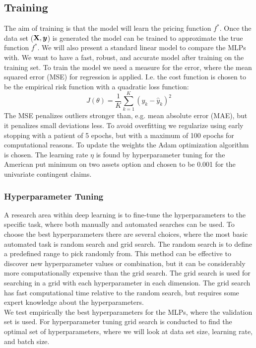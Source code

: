 \subsection{Training}\label{Training}
The aim of training is that the model will learn the pricing function $f^*$. Once the data set ($\mathbf{X}, \bm{y}$) is generated the model can be trained to approximate the true function $f^*$. We will also present a standard linear model to compare the MLPs with. We want to have a fast, robust, and accurate model after training on the training set. To train the model we need a measure for the error, where the mean squared error (MSE) for regression is applied. I.e. the cost function is chosen to be the empirical risk function with a quadratic loss function:
$$J(\theta)= \frac{1}{K} \sum_{k=1}^{K}(y_k-\hat{y}_k)^2$$
The MSE penalizes outliers stronger than, e.g. mean absolute error (MAE), but it penalizes small deviations less. To avoid overfitting we regularize using early stopping with a patient of 5 epochs, but with a maximum of 100 epochs for computational reasons. To update the weights the Adam optimization algorithm is chosen.  The learning rate $\eta$ is found by hyperparameter tuning for the American put minimum on two assets option and chosen to be 0.001 for the univariate contingent claims.\\

\subsubsection{Hyperparameter Tuning}
A research area within deep learning is to fine-tune the hyperparameters to the specific task, where both manually and automated searches can be used. To choose the best hyperparameters there are several choices, where the most basic automated task is random search and grid search. The random search is to define a predefined range to pick randomly from. This method can be effective to discover new hyperparameter values or combination, but it can be considerably more computationally expensive than the grid search. The grid search is used for searching in a grid with each hyperparameter in each dimension. The grid search has fast computational time relative to the random search, but requires some expert knowledge about the hyperparameters.\\

We test empirically the best hyperparameters for the MLPs, where the validation set is used. For hyperparameter tuning grid search is conducted to find the optimal set of hyperparameters, where we will look at data set size, learning rate, and batch size. \\


